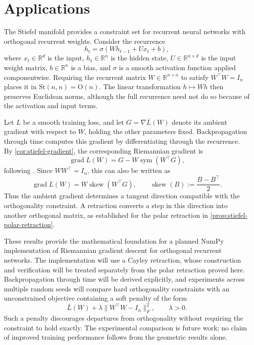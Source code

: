 \documentclass[12pt]{article}
\theoremstyle{definition}
\theoremstyle{plain}
\theoremstyle{remark}
\newcommand{\R}{\mathbb{R}}
\newcommand{\Orth}{\mathrm{O}}               %
\DeclareMathOperator{\sym}{sym}              %
\DeclareMathOperator{\Skew}{skew}            %
\DeclareMathOperator{\grad}{grad}            %
\begin{document}
\section{Applications}\label{sec:example}

The Stiefel manifold provides a constraint set for recurrent neural networks with orthogonal recurrent weights.
Consider the recurrence
\[
  h_t=\sigma(Wh_{t-1}+Ux_t+b),
\]
where \( x_t\in\R^d \) is the input, \( h_t\in\R^n \) is the hidden state, \( U\in\R^{n\times d} \) is the input weight matrix, \( b\in\R^n \) is a bias, and \( \sigma \) is a smooth activation function applied componentwise.
Requiring the recurrent matrix \( W\in\R^{n\times n} \) to satisfy \( W^\top W=I_n \) places it in \( \mathrm{St}(n,n)=\Orth(n) \).
The linear transformation \( h\mapsto Wh \) then preserves Euclidean norms, although the full recurrence need not do so because of the activation and input terms.

Let \( L \) be a smooth training loss, and let \( G=\nabla\bar{L}(W) \) denote its ambient gradient with respect to \( W \), holding the other parameters fixed.
Backpropagation through time computes this gradient by differentiating through the recurrence.
By \cref{cor:stiefel-gradient}, the corresponding Riemannian gradient is
\[
  \grad L(W)=G-W\sym(W^\top G),
\]
following \cite[Section 7.3, equation (7.28)]{boumal}.
Since \( WW^\top=I_n \), this can also be written as
\[
  \grad L(W)=W\Skew(W^\top G),
  \qquad \Skew(B):=\frac{B-B^\top}{2}.
\]
Thus the ambient gradient determines a tangent direction compatible with the orthogonality constraint.
A retraction converts a step in this direction into another orthogonal matrix, as established for the polar retraction in \cref{prop:stiefel-polar-retraction}.

These results provide the mathematical foundation for a planned NumPy implementation of Riemannian gradient descent for orthogonal recurrent networks.
The implementation will use a Cayley retraction, whose construction and verification will be treated separately from the polar retraction proved here.
Backpropagation through time will be derived explicitly, and experiments across multiple random seeds will compare hard orthogonality constraints with an unconstrained objective containing a soft penalty of the form
\[
  \bar{L}(W)+\lambda\|W^\top W-I_n\|_F^2,
  \qquad \lambda>0.
\]
Such a penalty discourages departures from orthogonality without requiring the constraint to hold exactly.
The experimental comparison is future work; no claim of improved training performance follows from the geometric results alone.
\end{document}
